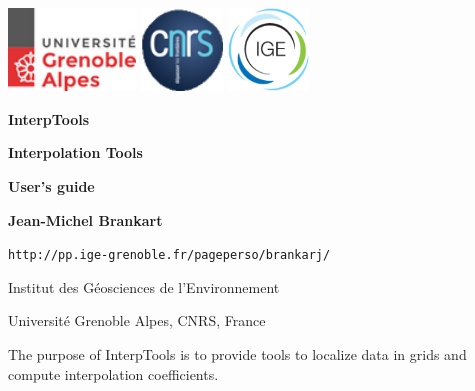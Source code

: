 \documentclass[11pt]{article}
\begin{document}
\pagestyle{empty}

\centerline{
\includegraphics[height=22mm]{Logos/logo_uga.png}
\hspace{5mm}
\includegraphics[height=22mm]{Logos/logo_cnrs.png}
\hfill
\includegraphics[height=22mm]{Logos/logo_ige.png}
}

\vspace{20mm}

\begin{center}

{\Huge\bf InterpTools}

\vspace{10mm}

{\Large\bf Interpolation Tools}

\vspace{10mm}

{\Large\bf User's guide}

\vspace{10mm}

{\large\bf Jean-Michel Brankart}

\vspace{5mm}
{\tt http://pp.ige-grenoble.fr/pageperso/brankarj/}

\vspace{5mm}
{\large Institut des G\'eosciences de l'Environnement}

\vspace{1mm}
{\large Universit\'e Grenoble Alpes, CNRS, France}

\end{center}

\vspace{20mm}
The purpose of InterpTools is to provide tools
to localize data in grids and compute interpolation coefficients.
\end{document}
